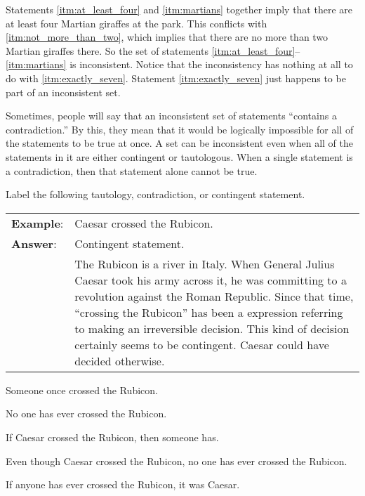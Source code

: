 Statements \ref{itm:at_least_four} and \ref{itm:martians} together imply that there are at least four Martian giraffes at the park. This conflicts with \ref{itm:not_more_than_two}, which implies that there are no more than two Martian giraffes there. So the set of statements \ref{itm:at_least_four}--\ref{itm:martians} is inconsistent. Notice that the inconsistency has nothing at all to do with \ref{itm:exactly_seven}. Statement \ref{itm:exactly_seven} just happens to be part of an inconsistent set.

Sometimes, people will say that an inconsistent set of statements ``contains a contradiction.'' By this, they mean that it would be logically impossible for all of the statements to be true at once. A set can be inconsistent even when all of the statements in it are either contingent or tautologous. When a single statement is a contradiction, then that statement alone cannot be true.



\practiceproblems
\noindent \problempart \label{pr.EnglishTautology} Label the following tautology, contradiction, or contingent statement.

\begin{longtabu}{p{.1\linewidth}p{.9\linewidth}}
\textbf{Example}: & Caesar crossed the Rubicon. \\
\textbf{Answer}: & Contingent statement. \\
&The Rubicon is a river in Italy. When General Julius Caesar took his army across it, he was committing to a revolution against the Roman Republic. Since that time, ``crossing the Rubicon'' has been a expression referring to making an irreversible decision. This kind of decision certainly seems to be contingent. Caesar could have decided otherwise.\\
\end{longtabu}

\begin{exercises}
\item Someone once crossed the Rubicon. 
\item No one has ever crossed the Rubicon. 
\item If Caesar crossed the Rubicon, then someone has. 
\item Even though Caesar crossed the Rubicon, no one has ever crossed the Rubicon. 
\item If anyone has ever crossed the Rubicon, it was Caesar. 
\end{exercises}

